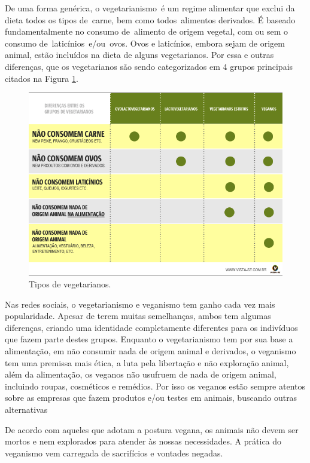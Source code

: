 De uma forma genérica, o vegetarianismo é um regime alimentar que exclui da dieta todos os tipos de carne, bem como todos alimentos derivados. É baseado fundamentalmente no consumo de alimento de origem vegetal, com ou sem o consumo de laticínios e/ou ovos. Ovos e laticínios, embora sejam de origem animal, estão incluídos na dieta de alguns vegetarianos. Por essa e outras diferenças, que os vegetarianos são sendo categorizados em 4 grupos principais citados na Figura \ref{fig:figura6}.

\begin{figure}[H]
	\caption{\label{fig:figura6}Tipos de vegetarianos.}
	\centering
	\includegraphics[scale=0.5]{imagens/figura6.png}
\end{figure}

Nas redes sociais, o vegetarianismo e veganismo tem ganho cada vez mais popularidade. Apesar de terem muitas semelhanças, ambos tem algumas diferenças, criando uma identidade completamente diferentes para os indivíduos que fazem parte destes grupos. Enquanto o vegetarianismo tem por sua base a alimentação, em não consumir nada de origem animal e derivados, o veganismo tem uma premissa mais ética, a luta pela libertação e não exploração animal, além da alimentação, os veganos não usufruem de nada de origem animal, incluindo roupas, cosméticos e remédios. Por isso os veganos estão sempre atentos sobre as empresas que fazem produtos e/ou testes em animais, buscando outras alternativas 

De acordo com aqueles que adotam a postura vegana, os animais não devem ser mortos e nem explorados para atender às nossas necessidades. A prática do veganismo vem carregada de sacrifícios e vontades negadas. 